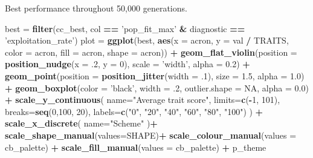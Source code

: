 \documentclass[]{book}
\newenvironment{Shaded}{\begin{snugshade}}{\end{snugshade}}
\newcommand{\DataTypeTok}[1]{\textcolor[rgb]{0.13,0.29,0.53}{#1}}
\newcommand{\DecValTok}[1]{\textcolor[rgb]{0.00,0.00,0.81}{#1}}
\newcommand{\FloatTok}[1]{\textcolor[rgb]{0.00,0.00,0.81}{#1}}
\newcommand{\KeywordTok}[1]{\textcolor[rgb]{0.13,0.29,0.53}{\textbf{#1}}}
\newcommand{\NormalTok}[1]{#1}
\newcommand{\OperatorTok}[1]{\textcolor[rgb]{0.81,0.36,0.00}{\textbf{#1}}}
\newcommand{\OtherTok}[1]{\textcolor[rgb]{0.56,0.35,0.01}{#1}}
\newcommand{\StringTok}[1]{\textcolor[rgb]{0.31,0.60,0.02}{#1}}
\begin{document}
Best performance throughout 50,000 generations.

\begin{Shaded}
\begin{Highlighting}[]
\NormalTok{best =}\StringTok{ }\KeywordTok{filter}\NormalTok{(cc_best, col }\OperatorTok{==}\StringTok{ 'pop_fit_max'} \OperatorTok{&}\StringTok{ }\NormalTok{diagnostic }\OperatorTok{==}\StringTok{ 'exploitation_rate'}\NormalTok{)}
\NormalTok{plot =}\StringTok{ }\KeywordTok{ggplot}\NormalTok{(best, }\KeywordTok{aes}\NormalTok{(}\DataTypeTok{x =}\NormalTok{ acron, }\DataTypeTok{y =}\NormalTok{ val }\OperatorTok{/}\StringTok{ }\NormalTok{TRAITS, }\DataTypeTok{color =}\NormalTok{ acron, }\DataTypeTok{fill =}\NormalTok{ acron, }\DataTypeTok{shape =}\NormalTok{ acron)) }\OperatorTok{+}
\StringTok{  }\KeywordTok{geom_flat_violin}\NormalTok{(}\DataTypeTok{position =} \KeywordTok{position_nudge}\NormalTok{(}\DataTypeTok{x =} \FloatTok{.2}\NormalTok{, }\DataTypeTok{y =} \DecValTok{0}\NormalTok{), }\DataTypeTok{scale =} \StringTok{'width'}\NormalTok{, }\DataTypeTok{alpha =} \FloatTok{0.2}\NormalTok{) }\OperatorTok{+}
\StringTok{  }\KeywordTok{geom_point}\NormalTok{(}\DataTypeTok{position =} \KeywordTok{position_jitter}\NormalTok{(}\DataTypeTok{width =} \FloatTok{.1}\NormalTok{), }\DataTypeTok{size =} \FloatTok{1.5}\NormalTok{, }\DataTypeTok{alpha =} \FloatTok{1.0}\NormalTok{) }\OperatorTok{+}
\StringTok{  }\KeywordTok{geom_boxplot}\NormalTok{(}\DataTypeTok{color =} \StringTok{'black'}\NormalTok{, }\DataTypeTok{width =} \FloatTok{.2}\NormalTok{, }\DataTypeTok{outlier.shape =} \OtherTok{NA}\NormalTok{, }\DataTypeTok{alpha =} \FloatTok{0.0}\NormalTok{) }\OperatorTok{+}
\StringTok{  }\KeywordTok{scale_y_continuous}\NormalTok{(}
    \DataTypeTok{name=}\StringTok{"Average trait score"}\NormalTok{,}
    \DataTypeTok{limits=}\KeywordTok{c}\NormalTok{(}\OperatorTok{-}\DecValTok{1}\NormalTok{, }\DecValTok{101}\NormalTok{),}
    \DataTypeTok{breaks=}\KeywordTok{seq}\NormalTok{(}\DecValTok{0}\NormalTok{,}\DecValTok{100}\NormalTok{, }\DecValTok{20}\NormalTok{),}
    \DataTypeTok{labels=}\KeywordTok{c}\NormalTok{(}\StringTok{"0"}\NormalTok{, }\StringTok{"20"}\NormalTok{, }\StringTok{"40"}\NormalTok{, }\StringTok{"60"}\NormalTok{, }\StringTok{"80"}\NormalTok{, }\StringTok{"100"}\NormalTok{)}
\NormalTok{  ) }\OperatorTok{+}
\StringTok{  }\KeywordTok{scale_x_discrete}\NormalTok{(}
    \DataTypeTok{name=}\StringTok{"Scheme"}
\NormalTok{  )}\OperatorTok{+}
\StringTok{  }\KeywordTok{scale_shape_manual}\NormalTok{(}\DataTypeTok{values=}\NormalTok{SHAPE)}\OperatorTok{+}
\StringTok{  }\KeywordTok{scale_colour_manual}\NormalTok{(}\DataTypeTok{values =}\NormalTok{ cb_palette) }\OperatorTok{+}
\StringTok{  }\KeywordTok{scale_fill_manual}\NormalTok{(}\DataTypeTok{values =}\NormalTok{ cb_palette) }\OperatorTok{+}
\StringTok{  }\NormalTok{p_theme}


\end{Highlighting}
\end{Shaded}
\end{document}
